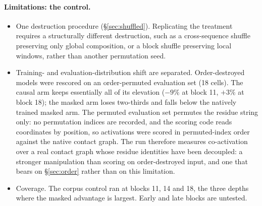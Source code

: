 \documentclass{article} %
\newcommand{\red}[1]{\textcolor{red}{#1}}
\newcommand{\opentag}[1]{\textcolor{red}{\textsuperscript{[\ref{#1}]}}}
\newcommand{\pend}[2]{\red{#1}\opentag{#2}}
\renewcommand{\red}[1]{#1}
\renewcommand{\opentag}[1]{}
\renewcommand{\pend}[2]{#1}
\begin{document}
\paragraph{Limitations: the control.}
\begin{itemize}[leftmargin=1.2em]
\item \pend{One destruction procedure (\S\ref{sec:shuffled}). Replicating the treatment requires a
structurally different destruction, such as a cross-sequence shuffle preserving only global
composition, or a block shuffle preserving local windows, rather than another permutation
seed.}{t:blockshuffle}
\item Training- and evaluation-distribution shift are separated. Order-destroyed models were
rescored on an order-permuted evaluation set (18 cells). The causal arm keeps essentially all of
its elevation ($-9\%$ at block 11, $+3\%$ at block 18); the masked arm loses two-thirds and falls
below the natively trained masked arm. The permuted evaluation set permutes the residue string
only: no permutation indices are recorded, and the scoring code reads coordinates by position, so
activations were scored in permuted-index order against the native contact graph. The run
therefore measures co-activation over a real contact graph whose residue identities have been
decoupled: a stronger manipulation than scoring on order-destroyed input, and one that bears on
\S\ref{sec:order} rather than on this limitation.
\item \pend{Coverage. The corpus control ran at blocks 11, 14 and 18, the three depths where the
masked advantage is largest. Early and late blocks are untested.}{t:depthgrid}
\end{itemize}
\end{document}
